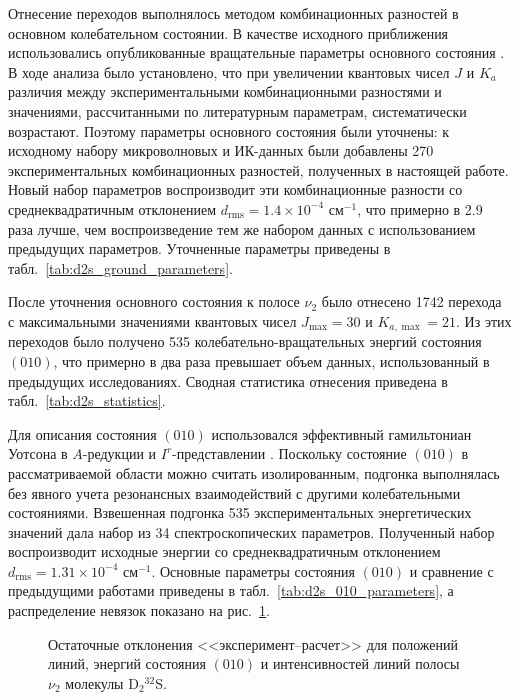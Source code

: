 Отнесение переходов выполнялось методом комбинационных разностей в основном колебательном состоянии.
В качестве исходного приближения использовались опубликованные вращательные параметры основного
состояния \cite{d2s_camy1985}. В ходе анализа было установлено, что при увеличении квантовых чисел
$J$ и $K_a$ различия между экспериментальными комбинационными разностями и значениями, рассчитанными
по литературным параметрам, систематически возрастают. Поэтому параметры основного состояния были
уточнены: к исходному набору микроволновых и ИК-данных были добавлены 270 экспериментальных
комбинационных разностей, полученных в настоящей работе. Новый набор параметров воспроизводит эти
комбинационные разности со среднеквадратичным отклонением $d_{\textrm{rms}}=1.4\times10^{-4}$
см$^{-1}$, что примерно в 2.9 раза лучше, чем воспроизведение тем же набором данных с использованием
предыдущих параметров. Уточненные параметры приведены в табл.~\ref{tab:d2s_ground_parameters}.



После уточнения основного состояния к полосе $\nu_2$ было отнесено 1742 перехода с максимальными
значениями квантовых чисел $J_{\max}=30$ и $K_{a,\max}=21$. Из этих переходов было получено 535
колебательно-вращательных энергий состояния $(010)$, что примерно в два раза превышает объем данных,
использованный в предыдущих исследованиях. Сводная статистика отнесения приведена в
табл.~\ref{tab:d2s_statistics}.



Для описания состояния $(010)$ использовался эффективный гамильтониан Уотсона в $A$-редукции и
$I^r$-представлении \cite{0102}. Поскольку состояние $(010)$ в рассматриваемой области можно считать
изолированным, подгонка выполнялась без явного учета резонансных взаимодействий с другими
колебательными состояниями. Взвешенная подгонка 535 экспериментальных энергетических значений дала
набор из 34 спектроскопических параметров. Полученный набор воспроизводит исходные энергии со
среднеквадратичным отклонением $d_{\textrm{rms}}=1.31\times10^{-4}$ см$^{-1}$. Основные параметры
состояния $(010)$ и сравнение с предыдущими работами приведены в
табл.~\ref{tab:d2s_010_parameters}, а распределение невязок показано на рис.~\ref{fig:d2s_residuals}.



\begin{figure}[htbp]
    \centering
    \caption{Остаточные отклонения <<эксперимент--расчет>> для положений линий, энергий состояния
    $(010)$ и интенсивностей линий полосы $\nu_2$ молекулы D$_2{}^{32}$S.}
    \label{fig:d2s_residuals}
\end{figure}

